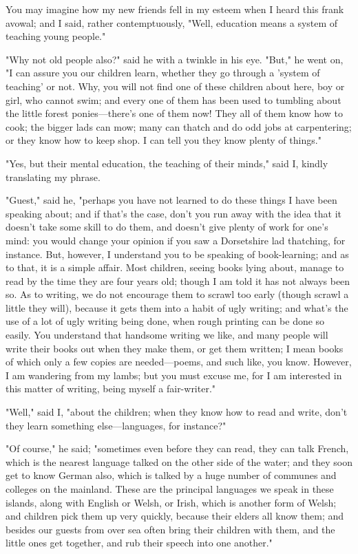 You may imagine how my new friends fell in my esteem when I heard this
frank avowal; and I said, rather contemptuously, "Well, education means
a system of teaching young people."

"Why not old people also?" said he with a twinkle in his eye. "But," he
went on, "I can assure you our children learn, whether they go through a
'system of teaching' or not. Why, you will not find one of these
children about here, boy or girl, who cannot swim; and every one of them
has been used to tumbling about the little forest ponies---there's one
of them now! They all of them know how to cook; the bigger lads can mow;
many can thatch and do odd jobs at carpentering; or they know how to
keep shop. I can tell you they know plenty of things."

"Yes, but their mental education, the teaching of their minds," said I,
kindly translating my phrase.

"Guest," said he, "perhaps you have not learned to do these things I
have been speaking about; and if that's the case, don't you run away
with the idea that it doesn't take some skill to do them, and doesn't
give plenty of work for one's mind: you would change your opinion if you
saw a Dorsetshire lad thatching, for instance. But, however, I
understand you to be speaking of book-learning; and as to that, it is a
simple affair. Most children, seeing books lying about, manage to read
by the time they are four years old; though I am told it has not always
been so. As to writing, we do not encourage them to scrawl too early
(though scrawl a little they will), because it gets them into a habit of
ugly writing; and what's the use of a lot of ugly writing being done,
when rough printing can be done so easily. You understand that handsome
writing we like, and many people will write their books out when they
make them, or get them written; I mean books of which only a few copies
are needed---poems, and such like, you know. However, I am wandering
from my lambs; but you must excuse me, for I am interested in this
matter of writing, being myself a fair-writer."

"Well," said I, "about the children; when they know how to read and
write, don't they learn something else---languages, for instance?"

"Of course," he said; "sometimes even before they can read, they can
talk French, which is the nearest language talked on the other side of
the water; and they soon get to know German also, which is talked by a
huge number of communes and colleges on the mainland. These are the
principal languages we speak in these islands, along with English or
Welsh, or Irish, which is another form of Welsh; and children pick them
up very quickly, because their elders all know them; and besides our
guests from over sea often bring their children with them, and the
little ones get together, and rub their speech into one another."

